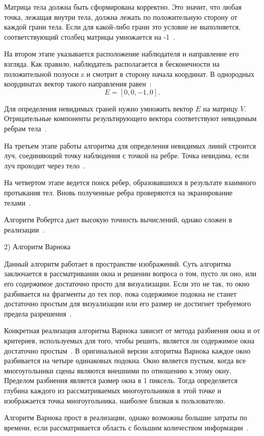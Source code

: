 Матрица тела должна быть сформирована корректно. Это значит, что любая
точка, лежащая внутри тела, должна лежать по положительную сторону от каждой
грани тела. Если для какой-либо грани это условие не выполняется,
соответствующий столбец матрицы умножается на -1~\cite{rojers}.

На втором этапе указывается расположение наблюдателя и направление его
взгляда. Как правило, наблюдатель располагается в бесконечности на
положительной полуоси z и смотрит в сторону начала координат. В однородных
координатах вектор такого направления равен~\cite{rojers}:
$$
	E = [0, 0, -1, 0].
$$

Для определения невидимых граней нужно умножить вектор $E$ на матрицу $V$. Отрицательные компоненты результирующего вектора соответствуют
невидимым ребрам тела~\cite{rojers}.

На третьем этапе работы алгоритма для определения невидимых линий
строится луч, соединяющий точку наблюдения с точкой на ребре. Точка невидима,
если луч проходит через тело~\cite{rojers}.

На четвертом этапе ведется поиск ребер, образовавшихся в результате
взаимного протыкания тел. Вновь полученные ребра проверяются на
экранирование телами~\cite{rojers}.

Алгоритм Робертса дает высокую точность вычислений, однако сложен в
реализации~\cite{rojers}.

2) Алгоритм Варнока

Данный алгоритм работает в пространстве изображений. Суть алгоритма заключается в рассматривании окна и решении вопроса о том, пусто ли оно, или его
содержимое достаточно просто для визуализации. Если это не так, то окно
разбивается на фрагменты до тех пор, пока содержимое подокна не станет достаточно простым для визуализации или его размер не достигнет требуемого
предела разрешения~\cite{rojers}.

Конкретная реализация алгоритма Варнока зависит от метода разбиения
окна и от критериев, используемых для того, чтобы решить, является ли
содержимое окна достаточно простым~\cite{rojers}. В оригинальной версии алгоритма Варнока
каждое окно разбивается на четыре одинаковых подокна. Окно является пустым,
когда все многоугольники сцены являются внешними по отношению к этому окну.
Пределом разбиения является размер окна в 1 пиксель. Тогда определяется глубина
каждого из рассматриваемых многоугольников в этой точке и изображается точка
многоугольника, наиболее близкая к пользователю.

Алгоритм Варнока прост в реализации, однако возможны большие затраты по
времени, если рассматривается область с большим количеством информации~\cite{rojers}.


